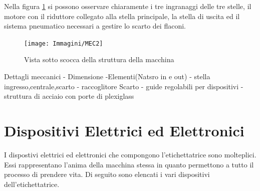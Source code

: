 \documentclass[12pt, a4paper, oneside]{book}
\begin{document}
Nella figura \ref{mec2} si possono osservare chiaramente i tre ingranaggi delle tre stelle, il motore con il riduttore collegato alla stella principale, la stella di uscita ed il sistema pneumatico necessari a gestire lo scarto dei flaconi.

\begin{figure}[H]
	\centering
	\texttt{[image: Immagini/MEC2]}
	\label{mec2}
	\caption{ Vista sotto scocca della struttura della macchina}
\end{figure}



Dettagli meccanici - Dimensione -Elementi(Natsro in e out) - stella ingresso,centrale,scarto - raccoglitore Scarto - guide regolabili per dispositivi - struttura di acciaio con porte di plexiglass
\section{Dispositivi Elettrici ed Elettronici}
I dispostivi elettrici ed elettronici che compongono l'etichettatrice sono molteplici. Essi rappresentano l'anima della macchina stessa in quanto permettono a tutto il processo di prendere vita.
Di seguito sono elencati i vari dispositivi dell'etichettatrice.
\end{document}

